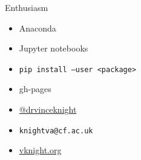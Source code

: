 \documentclass{beamer}
\begin{document}
    \begin{frame}
        \centering
        \Huge Enthusiasm
    \end{frame}

    \begin{frame}

            \begin{itemize}
                \item Anaconda
                \item Jupyter notebooks
                \item \texttt{pip install --user <package>} 
                \item gh-pages
                \item \href{https://twitter.com/drvinceknight}{@drvinceknight}
                \item \texttt{knightva@cf.ac.uk}
                \item \href{https://vknight.org}{vknight.org}
            \end{itemize}
    \end{frame}
\end{document}
